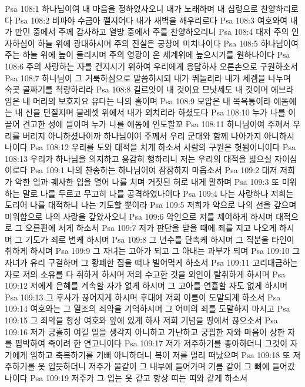 Psa 108:1  하나님이여 내 마음을 정하였사오니 내가 노래하며 내 심령으로 찬양하리로다
Psa 108:2  비파야 수금아 깰지어다 내가 새벽을 깨우리로다
Psa 108:3  여호와여 내가 만민 중에서 주께 감사하고 열방 중에서 주를 찬양하오리니
Psa 108:4  대저 주의 인자하심이 하늘 위에 광대하시며 주의 진실은 궁창에 미치나이다
Psa 108:5  하나님이여 주는 하늘 위에 높이 들리시며 주의 영광이 온 세계위에 높으시기를 원하나이다
Psa 108:6  주의 사랑하는 자를 건지시기 위하여 우리에게 응답하사 오른손으로 구원하소서
Psa 108:7  하나님이 그 거룩하심으로 말씀하시되 내가 뛰놀리라 내가 세겜을 나누며 숙곳 골짜기를 척량하리라
Psa 108:8  길르앗이 내 것이요 므낫세도 내 것이며 에브라임은 내 머리의 보호자요 유다는 나의 홀이며
Psa 108:9  모압은 내 목욕통이라 에돔에는 내 신을 던질지며 블레셋 위에서 내가 외치리라 하셨도다
Psa 108:10  누가 나를 이끌어 견고한 성에 들이며 누가 나를 에돔에 인도할꼬
Psa 108:11  하나님이여 주께서 우리를 버리지 아니하셨나이까 하나님이여 주께서 우리 군대와 함께 나아가지 아니하시나이다
Psa 108:12  우리를 도와 대적을 치게 하소서 사람의 구원은 헛됨이니이다
Psa 108:13  우리가 하나님을 의지하고 용감히 행하리니 저는 우리의 대적을 밟으실 자이심이로다
Psa 109:1  나의 찬송하는 하나님이여 잠잠하지 마옵소서
Psa 109:2  대저 저희가 악한 입과 궤사한 입을 열어 나를 치며 거짓된 혀로 내게 말하며
Psa 109:3  또 미워하는 말로 나를 두르고 무고히 나를 공격하였나이다
Psa 109:4  나는 사랑하나 저희는 도리어 나를 대적하니 나는 기도할 뿐이라
Psa 109:5  저희가 악으로 나의 선을 갚으며 미워함으로 나의 사랑을 갚았사오니
Psa 109:6  악인으로 저를 제어하게 하시며 대적으로 그 오른편에 서게 하소서
Psa 109:7  저가 판단을 받을 때에 죄를 지고 나오게 하시며 그 기도가 죄로 변케 하시며
Psa 109:8  그 년수를 단촉케 하시며 그 직분을 타인이 취하게 하시며
Psa 109:9  그 자녀는 고아가 되고 그 아내는 과부가 되며
Psa 109:10  그 자녀가 유리 구걸하며 그 황폐한 집을 떠나 빌어먹게 하소서
Psa 109:11  고리대금하는 자로 저의 소유를 다 취하게 하시며 저의 수고한 것을 외인이 탈취하게 하시며
Psa 109:12  저에게 은혜를 계속할 자가 없게 하시며 그 고아를 연휼할 자도 없게 하시며
Psa 109:13  그 후사가 끊어지게 하시며 후대에 저희 이름이 도말되게 하소서
Psa 109:14  여호와는 그 열조의 죄악을 기억하시며 그 어미의 죄를 도말하지 마시고
Psa 109:15  그 죄악을 항상 여호와 앞에 있게 하사 저희 기념을 땅에서 끊으소서
Psa 109:16  저가 긍휼히 여길 일을 생각지 아니하고 가난하고 궁핍한 자와 마음이 상한 자를 핍박하여 죽이려 한 연고니이다
Psa 109:17  저가 저주하기를 좋아하더니 그것이 자기에게 임하고 축복하기를 기뻐 아니하더니 복이 저를 멀리 떠났으며
Psa 109:18  또 저주하기를 옷 입듯하더니 저주가 물같이 그 내부에 들어가며 기름 같이 그 뼈에 들어갔나이다
Psa 109:19  저주가 그 입는 옷 같고 항상 띠는 띠와 같게 하소서
